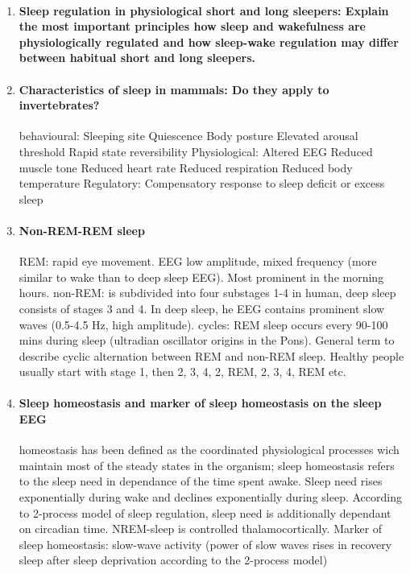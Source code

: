 \documentclass[12pt,article,oneside,a4paper]{memoir}
\begin{document}
\begin{enumerate}
\item \paragraph{Sleep regulation in physiological short and long sleepers: Explain the most important principles how sleep and wakefulness are physiologically regulated and how sleep-wake regulation may differ between habitual short and long sleepers.}

\item \paragraph{Characteristics of sleep in mammals: Do they apply to invertebrates?}
behavioural:
Sleeping site 
Quiescence
Body posture
Elevated arousal threshold
Rapid state reversibility
Physiological:
Altered EEG
Reduced muscle tone
Reduced heart rate
Reduced respiration
Reduced body temperature
Regulatory:
Compensatory response to sleep deficit or excess sleep

\item \paragraph{Non-REM-REM sleep}

REM: rapid eye movement. EEG low amplitude, mixed frequency (more similar to wake than to deep sleep EEG). Most prominent in the morning hours.
non-REM: is subdivided into four substages 1-4 in human, deep sleep consists of stages 3 and 4. In deep sleep, he EEG contains prominent slow waves (0.5-4.5 Hz, high amplitude).
cycles: REM sleep occurs every 90-100 mins during sleep (ultradian oscillator origins in the Pons). General term to describe cyclic alternation between REM and non-REM sleep. Healthy people usually start with stage 1, then 2, 3, 4, 2, REM, 2, 3, 4, REM etc.

\item \paragraph{Sleep homeostasis and marker of sleep homeostasis on the sleep EEG}

homeostasis has been defined as the coordinated physiological processes wich maintain most of the steady states in the organism; sleep homeostasis refers to the sleep need in dependance of the time spent awake. Sleep need rises exponentially during wake and declines exponentially during sleep. According to 2-process model of sleep regulation, sleep need is additionally dependant on circadian time.
	NREM-sleep is controlled thalamocortically.
        	Marker of sleep homeostasis: slow-wave activity (power of slow waves rises in recovery sleep after sleep deprivation according to the 2-process model)


\end{enumerate}
\end{document}
